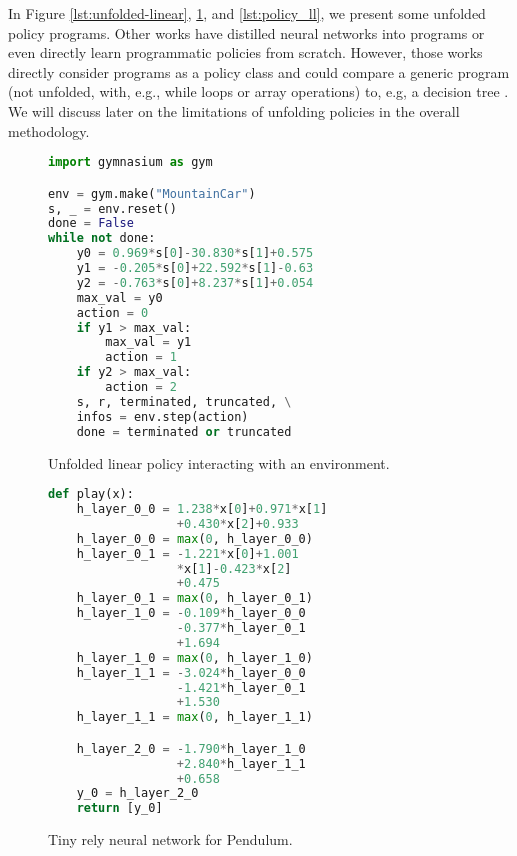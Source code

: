 In Figure \ref{lst:unfolded-linear}, \ref{lst:generic-linear}, and \ref{lst:policy_ll}, we present some unfolded policy programs.
Other works have distilled neural networks into programs \cite{PIRL} or even directly learn programmatic policies \cite{pirl2} from scratch.
However, those works directly consider programs as a policy class and could compare a generic program (not unfolded, with, e.g., while loops or array operations) to, e.g, a decision tree \cite{leap}.
We will discuss later on the limitations of unfolding policies in the overall methodology.

\begin{figure}
\centering
\begin{minipage}{0.47\textwidth}
\begin{lstlisting}[language=Python,style=mystyle]
import gymnasium as gym

env = gym.make("MountainCar")
s, _ = env.reset()
done = False
while not done:
    y0 = 0.969*s[0]-30.830*s[1]+0.575
    y1 = -0.205*s[0]+22.592*s[1]-0.63
    y2 = -0.763*s[0]+8.237*s[1]+0.054
    max_val = y0
    action = 0
    if y1 > max_val:
        max_val = y1
        action = 1
    if y2 > max_val:
        action = 2
    s, r, terminated, truncated, \
    infos = env.step(action)
    done = terminated or truncated
\end{lstlisting}
\caption{Unfolded linear policy interacting with an environment.}\label{lst:unfolded-linear}
\end{minipage}
\hfill
\begin{minipage}{0.47\textwidth}
\begin{lstlisting}[language=Python,style=mystyle]
def play(x):
    h_layer_0_0 = 1.238*x[0]+0.971*x[1]
                  +0.430*x[2]+0.933
    h_layer_0_0 = max(0, h_layer_0_0)
    h_layer_0_1 = -1.221*x[0]+1.001
                  *x[1]-0.423*x[2]
                  +0.475
    h_layer_0_1 = max(0, h_layer_0_1)
    h_layer_1_0 = -0.109*h_layer_0_0
                  -0.377*h_layer_0_1
                  +1.694
    h_layer_1_0 = max(0, h_layer_1_0)
    h_layer_1_1 = -3.024*h_layer_0_0
                  -1.421*h_layer_0_1
                  +1.530
    h_layer_1_1 = max(0, h_layer_1_1)

    h_layer_2_0 = -1.790*h_layer_1_0
                  +2.840*h_layer_1_1
                  +0.658
    y_0 = h_layer_2_0
    return [y_0]
\end{lstlisting}
\caption{Tiny rely neural network for Pendulum.}\label{lst:generic-linear}
\end{minipage}
\end{figure}